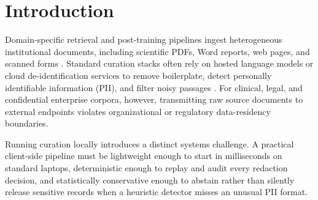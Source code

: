 \documentclass{article}
\begin{document}
\section{Introduction}
\label{sec:intro}

Domain-specific retrieval and post-training pipelines ingest heterogeneous institutional documents, including scientific PDFs, Word reports, web pages, and scanned forms \citep{soldaini2024dolma,penedo2024fineweb}. Standard curation stacks often rely on hosted language models or cloud de-identification services to remove boilerplate, detect personally identifiable information (PII), and filter noisy passages \citep{ai4privacy2023,presidio2021}. For clinical, legal, and confidential enterprise corpora, however, transmitting raw source documents to external endpoints violates organizational or regulatory data-residency boundaries.

Running curation locally introduces a distinct systems challenge. A practical client-side pipeline must be lightweight enough to start in milliseconds on standard laptops, deterministic enough to replay and audit every redaction decision, and statistically conservative enough to abstain rather than silently release sensitive records when a heuristic detector misses an unusual PII format.
\end{document}
